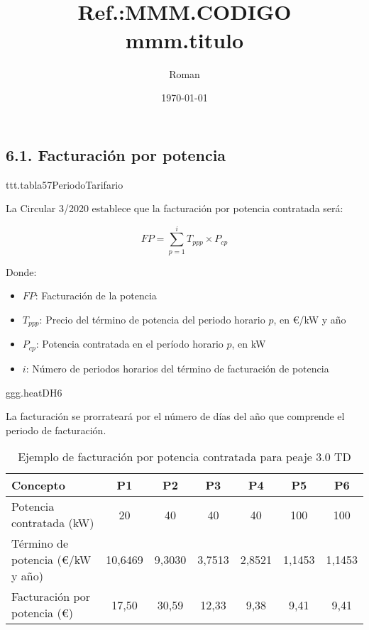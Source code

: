 \documentclass[a4paper,10pt]{article}
\title{{ \qrcode[height=1.3cm]{https://doctec.blog/} \\ \small Ref.:\uppercase{mmm.codigo}}\\{\textbf{mmm.titulo}}}
\author{
Roman
}
\date{\today}
\begin{document}
\begin{Form}
	\maketitle

	\tableofcontents  %
	\listoffigures    %
	\listoftables     %



    
\newpage







\section*{6.1. Facturación por potencia}

ttt.tabla57PeriodoTarifario

La Circular 3/2020 establece que la facturación por potencia contratada será:

\[ FP = \sum_{p=1}^{i} T_{ppp} \times P_{cp} \]

Donde:
\begin{itemize}
    \item $FP$: Facturación de la potencia
    \item $T_{ppp}$: Precio del término de potencia del periodo horario $p$, en €/kW y año
    \item $P_{cp}$: Potencia contratada en el período horario $p$, en kW \cite{precios}
    \item $i$: Número de periodos horarios del término de facturación de potencia
\end{itemize}

ggg.heatDH6

La facturación se prorrateará por el número de días del año que comprende el periodo de facturación.


\begin{table}[h]
\centering
\caption{Ejemplo de facturación por potencia contratada para peaje 3.0 TD}
\begin{tabular}{lcccccc}
\toprule
Concepto & P1 & P2 & P3 & P4 & P5 & P6 \\
\midrule
Potencia contratada (kW) & 20 & 40 & 40 & 40 & 100 & 100 \\
Término de potencia (€/kW y año) & 10,6469 & 9,3030 & 3,7513 & 2,8521 & 1,1453 & 1,1453 \\
Facturación por potencia (€) & 17,50 & 30,59 & 12,33 & 9,38 & 9,41 & 9,41 \\
\bottomrule
\end{tabular}
\end{table}





\end{Form}
\end{document}
